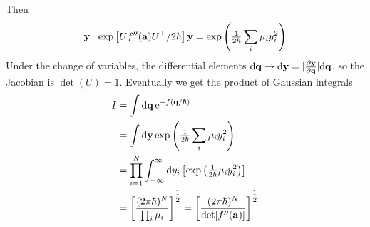 \documentclass[10pt]{article}
\begin{document}
	Then
	\begin{equation}
		{\bf y}^\top \exp\left[Uf''({\bf a})U^\top/2\hbar\right] {\bf y} = \exp\left(\tfrac{1}{2\hbar} \sum_i \mu_i y_i^2\right)
	\end{equation}
	Under the change of variables, the differential elements $\dd \bfq \to \dd \bfy = |\tfrac{\partial \bfy}{\partial \bfq}| \dd \bfq$, so the Jacobian is $\det(U) = 1$. Eventually we get the  product of Gaussian integrals
	\begin{align*}
		I &= \int \dd \bfq \, \e^{-f(\bfq/\hbar)}\\
		&= \int \dd \bfy \exp\left(\tfrac{1}{2\hbar} \sum_i \mu_i y_i^2\right) \\
		&= \prod_{i=1}^N \int_{-\infty}^{\infty} \dd y_i \left[ \exp\left(\tfrac{1}{2\hbar} \mu_i y_i^2\right) \right] \\
		&= \left[ \frac{(2\pi \hbar)^N}{\prod_i \mu_i} \right]^{\thalf} = \left[ \frac{(2\pi \hbar)^N}{\det[f''(\bfa)]} \right]^{\thalf}
	\end{align*}
\end{document}
